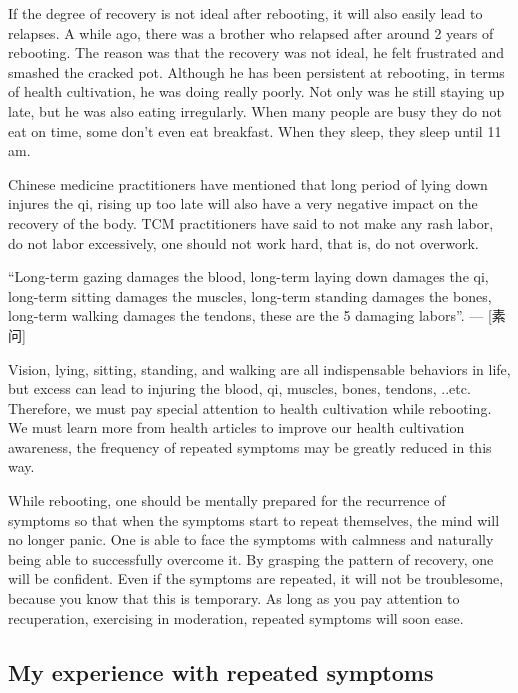 \documentclass[
]{book}
\begin{document}
If the degree of recovery is not ideal after rebooting, it will also easily lead to relapses. A while ago, there was a brother who relapsed after around 2 years of rebooting. The reason was that the recovery was not ideal, he felt frustrated and smashed the cracked pot. Although he has been persistent at rebooting, in terms of health cultivation, he was doing really poorly. Not only was he still staying up late, but he was also eating irregularly. When many people are busy they do not eat on time, some don't even eat breakfast. When they sleep, they sleep until 11 am.

Chinese medicine practitioners have mentioned that long period of lying down injures the qi, rising up too late will also have a very negative impact on the recovery of the body. TCM practitioners have said to not make any rash labor, do not labor excessively, one should not work hard, that is, do not overwork.

``Long-term gazing damages the blood, long-term laying down damages the qi, long-term sitting damages the muscles, long-term standing damages the bones, long-term walking damages the tendons, these are the 5 damaging labors''. --- {[}素问{]}

Vision, lying, sitting, standing, and walking are all indispensable behaviors in life, but excess can lead to injuring the blood, qi, muscles, bones, tendons, ..etc. Therefore, we must pay special attention to health cultivation while rebooting. We must learn more from health articles to improve our health cultivation awareness, the frequency of repeated symptoms may be greatly reduced in this way.

While rebooting, one should be mentally prepared for the recurrence of symptoms so that when the symptoms start to repeat themselves, the mind will no longer panic. One is able to face the symptoms with calmness and naturally being able to successfully overcome it. By grasping the pattern of recovery, one will be confident. Even if the symptoms are repeated, it will not be troublesome, because you know that this is temporary. As long as you pay attention to recuperation, exercising in moderation, repeated symptoms will soon ease.

\hypertarget{my-experience-with-repeated-symptoms}{%
\subsection{My experience with repeated symptoms}\label{my-experience-with-repeated-symptoms}}
\end{document}
